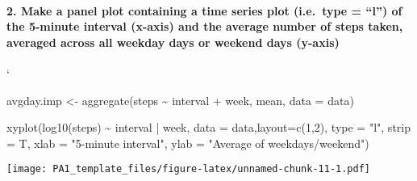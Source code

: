 \documentclass[
]{article}
\newenvironment{Shaded}{\begin{snugshade}}{\end{snugshade}}
\newcommand{\AttributeTok}[1]{\textcolor[rgb]{0.77,0.63,0.00}{#1}}
\newcommand{\DecValTok}[1]{\textcolor[rgb]{0.00,0.00,0.81}{#1}}
\newcommand{\FunctionTok}[1]{\textcolor[rgb]{0.00,0.00,0.00}{#1}}
\newcommand{\NormalTok}[1]{#1}
\newcommand{\OtherTok}[1]{\textcolor[rgb]{0.56,0.35,0.01}{#1}}
\newcommand{\SpecialCharTok}[1]{\textcolor[rgb]{0.00,0.00,0.00}{#1}}
\newcommand{\StringTok}[1]{\textcolor[rgb]{0.31,0.60,0.02}{#1}}
\begin{document}
\hypertarget{make-a-panel-plot-containing-a-time-series-plot-i.e.-type-l-of-the-5-minute-interval-x-axis-and-the-average-number-of-steps-taken-averaged-across-all-weekday-days-or-weekend-days-y-axis}{%
\paragraph{2. Make a panel plot containing a time series plot (i.e.~type
= ``l'') of the 5-minute interval (x-axis) and the average number of
steps taken, averaged across all weekday days or weekend days
(y-axis)}\label{make-a-panel-plot-containing-a-time-series-plot-i.e.-type-l-of-the-5-minute-interval-x-axis-and-the-average-number-of-steps-taken-averaged-across-all-weekday-days-or-weekend-days-y-axis}}

`

\begin{Shaded}
\begin{Highlighting}[]
\NormalTok{avgday.imp }\OtherTok{\textless{}{-}} \FunctionTok{aggregate}\NormalTok{(steps }\SpecialCharTok{\textasciitilde{}}\NormalTok{ interval }\SpecialCharTok{+}\NormalTok{ week, mean, }\AttributeTok{data =}\NormalTok{ data)}


\FunctionTok{xyplot}\NormalTok{(}\FunctionTok{log10}\NormalTok{(steps) }\SpecialCharTok{\textasciitilde{}}\NormalTok{ interval }\SpecialCharTok{|}\NormalTok{ week, }\AttributeTok{data =}\NormalTok{ data,}\AttributeTok{layout=}\FunctionTok{c}\NormalTok{(}\DecValTok{1}\NormalTok{,}\DecValTok{2}\NormalTok{),}
       \AttributeTok{type =} \StringTok{"l"}\NormalTok{, }\AttributeTok{strip =}\NormalTok{ T, }\AttributeTok{xlab =} \StringTok{"5{-}minute interval"}\NormalTok{,}
       \AttributeTok{ylab =} \StringTok{"Average of weekdays/weekend"}\NormalTok{)}
\end{Highlighting}
\end{Shaded}

\texttt{[image: PA1\_template\_files/figure-latex/unnamed-chunk-11-1.pdf]}
\end{document}
